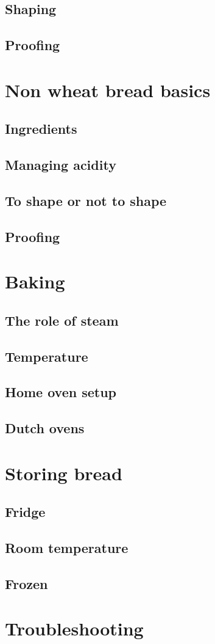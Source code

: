 \documentclass[a4paper, 12pt]{book}
\begin{document}
\section{Shaping}
\section{Proofing}

\chapter{Non wheat bread basics}
\section{Ingredients}
\section{Managing acidity}
\section{To shape or not to shape}
\section{Proofing}

\chapter{Baking}
\section{The role of steam}
\section{Temperature}
\section{Home oven setup}
\section{Dutch ovens}

\chapter{Storing bread}
\section{Fridge}
\section{Room temperature}
\section{Frozen}

\chapter{Troubleshooting}




\printbibliography
\end{document}
